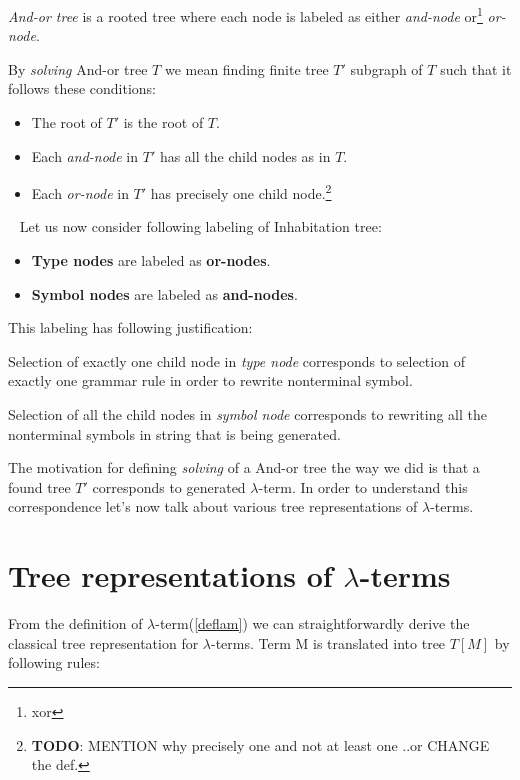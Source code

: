 \documentclass[12pt,a4paper]{report}
\newcommand{\Lets}{Let us\xspace}
\newcommand{\lterm}{$\lambda$-term\xspace}
\newcommand{\lterms}{$\lambda$-terms\xspace}
\begin{document}
\textit{And-or tree} is a rooted tree where each node is labeled as either \textit{and-node} 
or\footnote{xor} \textit{or-node}.

By \textit{solving} And-or tree $T$ we mean finding finite tree $T'$
subgraph of $T$ such that it follows these conditions: 
\begin{itemize}
	\item The root of $T'$ is the root of $T$.
	\item Each \textit{and-node} in $T'$ has all the child nodes as in $T$.
	\item Each \textit{or-node}  in $T'$ has precisely one child 
	      node.\footnote{\textbf{TODO}: MENTION why precisely one 
	      and not at least one ..or CHANGE the def. }   
\end{itemize}
~
\Lets now consider following labeling of Inhabitation tree: 

\begin{itemize}
  \item \textbf{Type nodes}   are labeled as \textbf{or-nodes}.   
  \item \textbf{Symbol nodes} are labeled as \textbf{and-nodes}.
\end{itemize}

This labeling has following justification: 

Selection of exactly one
child node in \textit{type node} corresponds to selection of exactly one
grammar rule in order to rewrite nonterminal symbol.  

Selection of all the child nodes in \textit{symbol node} corresponds to 
rewriting all the nonterminal symbols in string that is being generated.  

The motivation for defining \textit{solving} of a And-or tree the way we did is that
a found tree $T'$ corresponds to generated \lterm. 
In order to understand this correspondence let's now talk about various tree representations
of \lterms.

\section{Tree representations of \lterms}
\label{tree-reps}

\newcommand{\sexprTree}{sexpr-tree\xspace}
\newcommand{\atTree}{@-tree\xspace}



From the definition of \lterm (\ref{deflam}) we can straightforwardly derive 
the classical tree representation for \lterms. Term M is translated into tree $T[M]$ by following rules:
\end{document}
